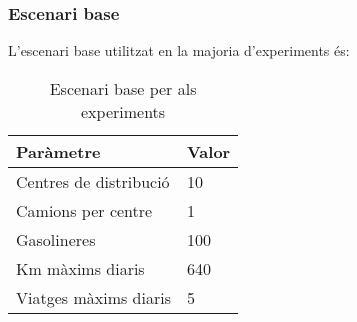 \subsubsection{Escenari base}

L'escenari base utilitzat en la majoria d'experiments és:

\begin{table}[H]
\centering
\begin{tabular}{@{}ll@{}}
\toprule
\textbf{Paràmetre} & \textbf{Valor} \\
\midrule
Centres de distribució & 10 \\
Camions per centre & 1 \\
Gasolineres & 100 \\
Km màxims diaris & 640 \\
Viatges màxims diaris & 5 \\
\bottomrule
\end{tabular}
\caption{Escenari base per als experiments}
\label{tab:escenari-base}
\end{table}








